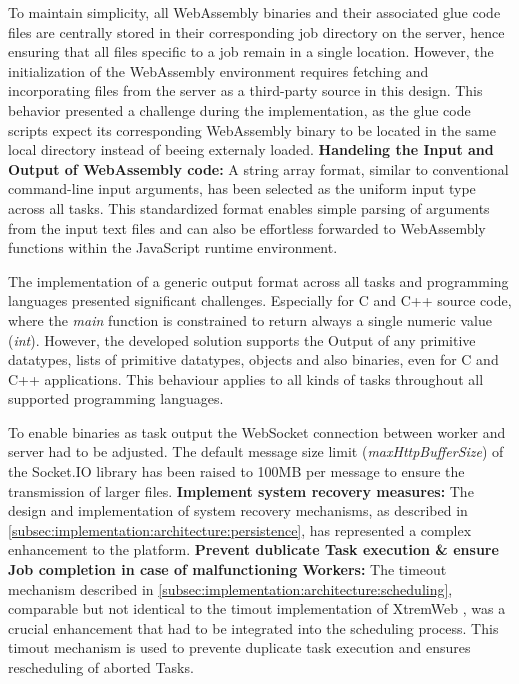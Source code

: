 To maintain simplicity, all WebAssembly binaries and their associated glue code files are centrally stored in their corresponding job directory on the server, hence ensuring that all files specific to a job remain in a single location. However, the initialization of the WebAssembly environment requires fetching and incorporating files from the server as a third-party source in this design. This behavior presented a challenge during the implementation, as the glue code scripts expect its corresponding WebAssembly binary to be located in the same local directory instead of beeing externaly loaded.
\newline
\newline
\textbf{Handeling the Input and Output of WebAssembly code:}
\newline
A string array format, similar to conventional command-line input arguments, has been selected as the uniform input type across all tasks. This standardized format enables simple parsing of arguments from the input text files and can also be effortless forwarded to WebAssembly functions within the JavaScript runtime environment.

The implementation of a generic output format across all tasks and programming languages presented significant challenges. Especially for C and C++ source code, where the \emph{main} function is constrained to return always a single numeric value (\emph{int}). However, the developed solution supports the Output of any primitive datatypes, lists of primitive datatypes, objects and also binaries, even for C and C++ applications. This behaviour applies to all kinds of tasks throughout all supported programming languages.

To enable binaries as task output the WebSocket connection between worker and server had to be adjusted. The default message size limit (\emph{maxHttpBufferSize}) of the Socket.IO library has been raised to 100MB per message to ensure the transmission of larger files.
\newline
\newline
\textbf{Implement system recovery measures:}
\newline
The design and implementation of system recovery mechanisms, as described in \autoref{subsec:implementation:architecture:persistence}, has represented a complex enhancement to the platform.
\newline
\newline
\textbf{Prevent dublicate Task execution \& ensure Job completion in case of malfunctioning Workers:}
\newline
The timeout mechanism described in \autoref{subsec:implementation:architecture:scheduling}, comparable but not identical to the timout implementation of XtremWeb \cite{relatedwork:xtremweb}, was a crucial enhancement that had to be integrated into the scheduling process. This timout mechanism is used to prevente duplicate task execution and ensures rescheduling of aborted Tasks.